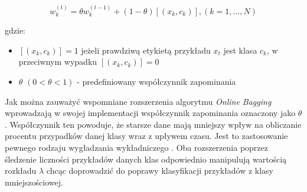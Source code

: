 \begin{equation}
    w^{(t)}_k = \theta w^{(t-1)}_k + (1 - \theta)[(x_k, c_k)], (k = 1, ..., N)
\end{equation}

\noindent gdzie:

\begin{itemize}
    \item $[(x_k, c_k)] = 1$ jeżeli prawdziwą etykietą przykładu $x_t$ jest klasa $c_k$, w przeciwnym wypadku $[(x_k, c_k)] = 0$
    \item $\theta$ $(0 < \theta < 1)$ - predefiniowany współczynnik zapominania
\end{itemize}

\noindent Jak można zauważyć wspomniane rozszerzenia algorytmu \textit{Online Bagging} wprowadzają w swojej implementacji współczynnik zapominania oznaczony jako $\theta$. Współczynnik ten powoduje, że starsze dane mają mniejszy wpływ na obliczanie procentu przypadków danej klasy wraz z upływem czasu. Jest to zastosowanie pewnego rodzaju wygładzania wykładniczego \cite{Article:OBSecond}. Oba rozszerzenia poprzez śledzenie liczności przykładów danych klas odpowiednio manipulują wartością rozkładu $\lambda$ chcąc doprowadzić do poprawy klasyfikacji przykładów z klasy mniejszościowej.

\newpage\null\thispagestyle{empty}\newpage